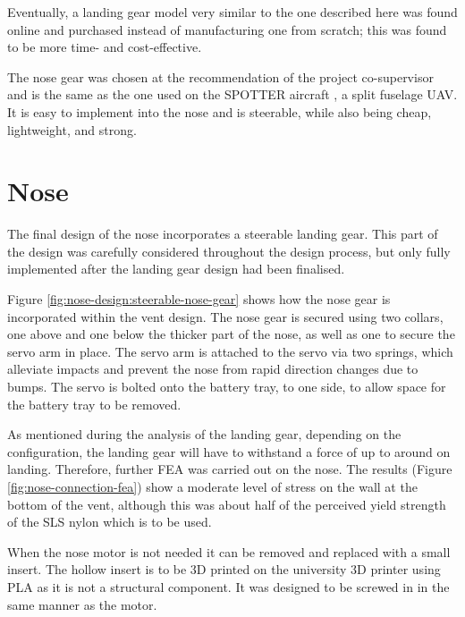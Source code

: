 \documentclass[../../main.tex]{subfiles}
\begin{document}
Eventually, a landing gear model very similar to the one described here was found online and purchased instead of manufacturing one from scratch; this was found to be more time- and cost-effective.


The nose gear was chosen at the recommendation of the project co-supervisor and is the same as the one used on the SPOTTER aircraft \cite{spotter-19}, a  split fuselage UAV.
It is easy to implement into the nose and is steerable, while also being cheap, lightweight, and strong. 

\section{Nose} \label{sec:final-design-proposal:nose}

The final design of the nose incorporates a steerable landing gear.
This part of the design was carefully considered throughout the design process, but only fully implemented after the landing gear design had been finalised. 


Figure \ref{fig:nose-design:steerable-nose-gear} shows how the nose gear is incorporated within the vent design.
The nose gear is secured using two collars, one above and one below the thicker part of the nose, as well as one to secure the servo arm in place.
The servo arm is attached to the servo via two springs, which alleviate impacts and prevent the nose from rapid direction changes due to bumps.
The servo is bolted onto the battery tray, to one side, to allow space for the battery tray to be removed. 

As mentioned during the analysis of the landing gear, depending on the configuration, the landing gear will have to withstand a force of up to around  on landing.
Therefore, further FEA was carried out on the nose.
The results (Figure \ref{fig:nose-connection-fea}) show a moderate level of stress on the wall at the bottom of the vent, although this was about half of the perceived yield strength of the SLS nylon which is to be used. 


When the nose motor is not needed it can be removed and replaced with a small insert.
The hollow insert is to be 3D printed on the university 3D printer using PLA as it is not a structural component.
It was designed to be screwed in in the same manner as the motor. 
\end{document}
